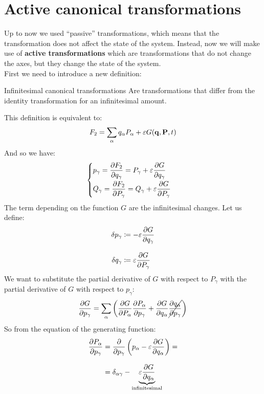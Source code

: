 \section{Active canonical transformations}
Up to now we used ``passive'' transformations, which means that the transformation does not affect the state of the system. Instead, now we will make use of \textbf{active transformations} which are transformations that do not change the axes, but they change the state of the system.\\
First we need to introduce a new definition:
\begin{definition}{Infinitesimal canonical transformations}
    Are transformations that differ from the identity transformation for an infinitesimal amount.
\end{definition}
This definition is equivalent to:
\begin{equation}
    F_2 = \displaystyle\sum_{\alpha} q_{\alpha}P_{\alpha} + \varepsilon G(\vb{q},\vb{P},t)
\end{equation}
And so we have:
\begin{equation}
    \begin{cases}
        p_{\gamma} = \pdv{F_2}{q_{\gamma}} = P_{\gamma} + \varepsilon\pdv{ G}{q_{\gamma}}\\[8pt]
        Q_{\gamma} = \pdv{F_2}{P_{\gamma}} = Q_{\gamma} + \varepsilon\pdv{ G}{P_{\gamma}}
    \end{cases}
\end{equation}
The term depending on the function $G$ are the infinitesimal changes. Let us define:
\begin{equation}
    \begin{split}
        \delta p_{\gamma} &\defineeq -\varepsilon\pdv{ G}{q_{\gamma}}\\[8pt]
        \delta q_{\gamma} &\defineeq \varepsilon\pdv{ G}{P_{\gamma}}
    \end{split}
\end{equation}
We want to substitute the partial derivative of $G$ with respect to $P_{\gamma}$ with the partial derivative of $G$ with respect to $p_{\gamma}$:
\begin{equation}
    \pdv{G}{p_{\gamma}} = \bigsum_{\alpha} \brackets{\pdv{G}{P_{\alpha}}\pdv{P_{\alpha}}{p_{\gamma}} + \pdv{G}{q_{\alpha}}\cancel{\pdv{q_{\alpha}}{p_{\gamma}}}}
\end{equation}
So from the equation of the generating function:
\begin{equation}
    \begin{split}
        \pdv{P_{\alpha}}{p_{\gamma}} &= \pdv{}{p_{\gamma}}\brackets{p_{\alpha} - \varepsilon\pdv{ G}{q_{\alpha}}} = \\[8pt]
        &= \delta_{\alpha \gamma} - \underbrace{\varepsilon\pdv{ G}{q_{\alpha}}}_{\text{infinitesimal}}
    \end{split}
\end{equation}

